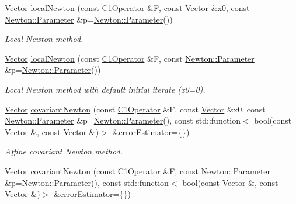 \begin{DoxyCompactItemize}
\item 
\hyperlink{classSpacy_1_1Vector}{Vector} \hyperlink{group__NewtonGroup_ga448b8e78b2e84ed78e70c42114ea7599}{local\-Newton} (const \hyperlink{classSpacy_1_1C1Operator}{C1\-Operator} \&F, const \hyperlink{classSpacy_1_1Vector}{Vector} \&x0, const \hyperlink{structSpacy_1_1Newton_1_1Parameter}{Newton\-::\-Parameter} \&p=\hyperlink{structSpacy_1_1Newton_1_1Parameter}{Newton\-::\-Parameter}())
\begin{DoxyCompactList}\small\item\em Local Newton method. \end{DoxyCompactList}\item 
\hyperlink{classSpacy_1_1Vector}{Vector} \hyperlink{group__NewtonGroup_gafbe5e25f46f7b0d237f5e9971cef998a}{local\-Newton} (const \hyperlink{classSpacy_1_1C1Operator}{C1\-Operator} \&F, const \hyperlink{structSpacy_1_1Newton_1_1Parameter}{Newton\-::\-Parameter} \&p=\hyperlink{structSpacy_1_1Newton_1_1Parameter}{Newton\-::\-Parameter}())
\begin{DoxyCompactList}\small\item\em Local Newton method with default initial iterate (x0=0). \end{DoxyCompactList}\item 
\hyperlink{classSpacy_1_1Vector}{Vector} \hyperlink{group__NewtonGroup_ga6c18ad252cb530e4f6734eb4e4fda481}{covariant\-Newton} (const \hyperlink{classSpacy_1_1C1Operator}{C1\-Operator} \&F, const \hyperlink{classSpacy_1_1Vector}{Vector} \&x0, const \hyperlink{structSpacy_1_1Newton_1_1Parameter}{Newton\-::\-Parameter} \&p=\hyperlink{structSpacy_1_1Newton_1_1Parameter}{Newton\-::\-Parameter}(), const std\-::function$<$ bool(const \hyperlink{classSpacy_1_1Vector}{Vector} \&, const \hyperlink{classSpacy_1_1Vector}{Vector} \&)$>$ \&error\-Estimator=\{\})
\begin{DoxyCompactList}\small\item\em Affine covariant Newton method. \end{DoxyCompactList}\item 
\hyperlink{classSpacy_1_1Vector}{Vector} \hyperlink{group__NewtonGroup_ga2d469322482680319bf81d865ed57068}{covariant\-Newton} (const \hyperlink{classSpacy_1_1C1Operator}{C1\-Operator} \&F, const \hyperlink{structSpacy_1_1Newton_1_1Parameter}{Newton\-::\-Parameter} \&p=\hyperlink{structSpacy_1_1Newton_1_1Parameter}{Newton\-::\-Parameter}(), const std\-::function$<$ bool(const \hyperlink{classSpacy_1_1Vector}{Vector} \&, const \hyperlink{classSpacy_1_1Vector}{Vector} \&)$>$ \&error\-Estimator=\{\})

\end{DoxyCompactItemize}
